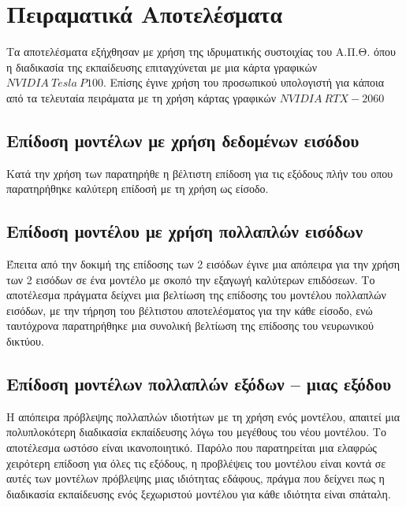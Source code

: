 \chapter{Πειραματικά Αποτελέσματα}
\label{ch:experiments_results}

Τα αποτελέσματα εξήχθησαν με χρήση της ιδρυματικής συστοιχίας του Α.Π.Θ. \cite{hpcauth} όπου η διαδικασία της εκπαίδευσης επιταγχύνεται με μια κάρτα γραφικών $NVIDIA~Tesla~P100$. Επίσης έγινε χρήση του προσωπικού υπολογιστή για κάποια από τα τελευταία πειράματα με τη χρήση κάρτας γραφικών $NVIDIA~RTX-2060$

\section{Επίδοση μοντέλων με χρήση δεδομένων εισόδου }
Κατά την χρήση των  παρατηρήθε η βέλτιστη επίδοση για τις εξόδους  πλήν του  οπου παρατηρήθηκε καλύτερη επίδοσή με τη χρήση  ως είσοδο.

\section{Επίδοση μοντέλου με χρήση πολλαπλών εισόδων}
Έπειτα από την δοκιμή της επίδοσης των 2 εισόδων έγινε μια απόπειρα για την χρήση των 2 εισόδων σε ένα μοντέλο με σκοπό την εξαγωγή καλύτερων επιδόσεων. Το αποτέλεσμα πράγματα δείχνει μια βελτίωση της επίδοσης του μοντέλου πολλαπλών εισόδων, με την τήρηση του βέλτιστου αποτελέσματος για την κάθε είσοδο, ενώ ταυτόχρονα παρατηρήθηκε μια συνολική βελτίωση της επίδοσης του νευρωνικού δικτύου.

\section{Επίδοση μοντέλων πολλαπλών εξόδων -- μιας εξόδου}
Η απόπειρα πρόβλεψης πολλαπλών ιδιοτήτων με τη χρήση ενός μοντέλου, απαιτεί μια πολυπλοκότερη διαδικασία εκπαίδευσης λόγω του μεγέθους του νέου μοντέλου. Το αποτέλεσμα ωστόσο είναι ικανοποιητικό. Παρόλο που παρατηρείται μια ελαφρώς χειρότερη επίδοση για όλες τις εξόδους, η προβλέψεις του μοντέλου είναι κοντά σε αυτές των μοντέλων πρόβλεψης μιας ιδιότητας εδάφους, πράγμα που δείχνει πως η διαδικασία εκπαίδευσης ενός ξεχωριστού μοντέλου για κάθε ιδιότητα είναι σπάταλη.

